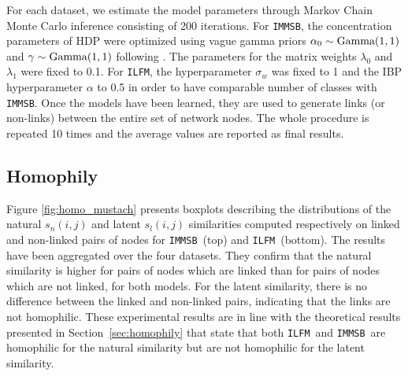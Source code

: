 \documentclass[journal]{IEEEtran}
\renewcommand{\text}{\textnormal}
\newcommand{\ifm}{\texttt{ILFM}}
\newcommand{\imb}{\texttt{IMMSB}}
\begin{document}
For each dataset, we estimate the model parameters through Markov Chain Monte Carlo inference consisting of 200 iterations. For \imb, the concentration parameters of HDP were optimized  using vague gamma priors $\alpha_0 \sim \text{Gamma}(1,1)$ and $\gamma \sim \text{Gamma}(1,1)$ following \cite{HDP}. The parameters for the matrix weights  $\lambda_0$ and $\lambda_1$ were fixed to 0.1. For \ifm, the hyperparameter  $\sigma_w$ was fixed to 1 and the IBP hyperparameter $\alpha$ to 0.5 in order to  have comparable number of classes with \imb. Once the models have been learned, they are used to generate links (or non-links) between the entire set of network nodes. The whole procedure is repeated 10 times and the average values are reported as final results.

\subsection{Homophily}

Figure \ref{fig:homo_mustach} presents boxplots describing the distributions of the natural $s_n(i,j)$ and latent $s_l(i,j)$ similarities computed respectively on linked and non-linked pairs of nodes for \imb\ (top) and \ifm\ (bottom). The results have been aggregated over the four datasets. They confirm that the natural similarity is  higher for pairs of nodes which are linked than for pairs of nodes which are not linked, for both models. For the latent similarity,  there is no difference between the linked and non-linked pairs, indicating that the links are not homophilic. These experimental results are in line with the theoretical results presented in Section~\ref{sec:homophily} that state that both \ifm\ and \imb\ are homophilic for  the natural similarity but are not homophilic for the latent similarity.
\end{document}
